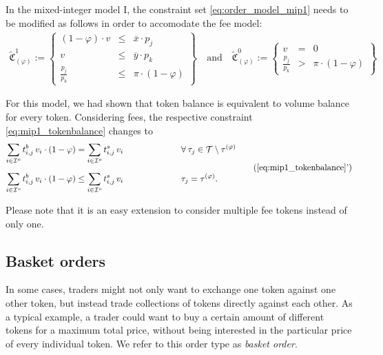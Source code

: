 \documentclass[11pt,parskip=full]{scrartcl}%
\newcommand*{\tokens}{\mathcal{T}}          %
\newcommand*{\iorders}{\mathcal{I}^o}       %
\begin{document}
In the mixed-integer model I, the constraint set \eqref{eq:order_model_mip1} needs to be modified as follows in order to accomodate the fee model:
\begin{align}
  \tilde{\mathfrak{C}}^1_{(\varphi)} := \left\{
  \begin{array}{rlll}
    (1-\varphi) \cdot v &\le & \overline{x} \cdot p_j \\
    v &\le & \overline{y} \cdot p_k \\[1mm]
    \frac{p_j}{p_k} &\le & \pi \cdot (1-\varphi)
  \end{array}
  \right\}
  \quad
  \text{and}
  \quad
  \tilde{\mathfrak{C}}^0_{(\varphi)} := \left\{
  \begin{array}{rll}
    v &= & 0 \\[1mm]
    \frac{p_j}{p_k} &> & \pi \cdot (1-\varphi)
  \end{array}
  \right\}
  \label{eq:order_model_mip1_fee}
\end{align}

For this model, we had shown that token balance is equivalent to volume balance for every token.
Considering fees, the respective constraint \eqref{eq:mip1_tokenbalance} changes to
\begin{equation}
  \begin{aligned}
    \sum\limits_{i \in \iorders} t^b_{i,j} \, v_i \cdot (1-\varphi)
    &= \sum\limits_{i \in \iorders} t^s_{i,j} \, v_i
    &&\hspace{2cm} \forall \> \tau_j \in \tokens \setminus \tau^{(\varphi)} \\[2mm]
    \sum\limits_{i \in \iorders} t^b_{i,j} \, v_i \cdot (1-\varphi)
    &\le \sum\limits_{i \in \iorders} t^s_{i,j} \, v_i
    &&\hspace{2cm} \tau_j = \tau^{(\varphi)}.
  \end{aligned}
  \tag{\ref{eq:mip1_tokenbalance}'}
\end{equation}

Please note that it is an easy extension to consider multiple fee tokens instead of only one.




\newpage
\subsection{Basket orders}
\label{subsec:basket_orders}

In some cases, traders might not only want to exchange one token against one other token, but
instead trade collections of tokens directly against each other.
As a typical example, a trader could want to buy a certain amount of different tokens for a maximum
total price, without being interested in the particular price of every individual token.
We refer to this order type as \emph{basket order}.
\end{document}
